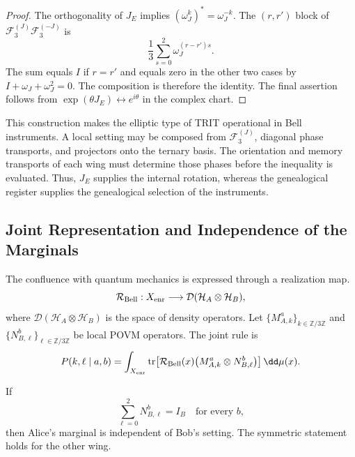 \begin{proof}
The orthogonality of \(J_E\) implies
\((\omega_J^k)^{\!*}=\omega_J^{-k}\). The \((r,r')\) block of
\(\mathcal F_3^{(J)}\mathcal F_3^{(-J)}\) is
\[
 \frac13\sum_{s=0}^{2}\omega_J^{(r-r')s}.
\]
The sum equals \(I\) if \(r=r'\) and equals zero in the other two cases by
\(I+\omega_J+\omega_J^2=0\). The composition is therefore the identity.
The final assertion follows from
\(\exp(\theta J_E)\leftrightarrow e^{i\theta}\) in the complex chart.
\end{proof}

This construction makes the elliptic type of TRIT operational in Bell
instruments. A local setting may be composed from
\(\mathcal F_3^{(J)}\), diagonal phase transports, and projectors onto the ternary
basis. The orientation and memory transports of each wing must determine
those phases before the inequality is evaluated. Thus, \(J_E\) supplies the internal
rotation, whereas the genealogical register supplies the genealogical selection of the instruments.

\subsection{Joint Representation and Independence of the Marginals}

The confluence with quantum mechanics is expressed through a realization map.
\begin{equation}
 \mathcal R_{\rm Bell}:X_{\rm enr}\longrightarrow
 \mathcal D(\mathcal H_A\otimes\mathcal H_B),
 \label{eq:realizacion-bell}
\end{equation}
where \(\mathcal D(\mathcal H_A\otimes\mathcal H_B)\) is the space of
density operators. Let
\(\{M_{A,k}^{a}\}_{k\in\mathbb Z/3\mathbb Z}\) and
\(\{N_{B,\ell}^{b}\}_{\ell\in\mathbb Z/3\mathbb Z}\) be local POVM operators. The
joint rule is
\begin{equation}
 P(k,\ell\mid a,b)
 =\int_{X_{\rm enr}}
  \operatorname{tr}\!\left[
   \mathcal R_{\rm Bell}(x)
   \bigl(M_{A,k}^{a}\otimes N_{B,\ell}^{b}\bigr)
  \right]\dd\mu(x).
 \label{eq:born-bell-hmt}
\end{equation}

\begin{proposition}
\label{prop:no-signaling-hmt}
If
\[
 \sum_{\ell=0}^{2}N_{B,\ell}^{b}=I_B
 \quad\text{for every }b,
\]
then Alice's marginal is independent of Bob's setting. The symmetric
statement holds for the other wing.
\end{proposition}

